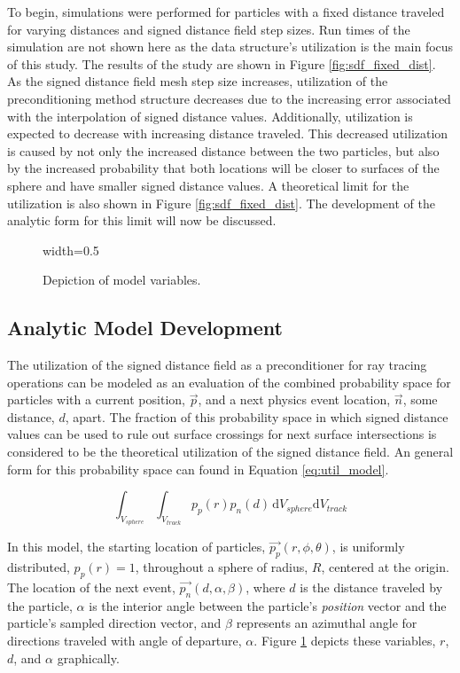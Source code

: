 To begin, simulations were performed for particles with a fixed distance
traveled for varying distances and signed distance field step sizes. Run times
of the simulation are not shown here as the data structure's utilization is the
main focus of this study. The results of the study are shown in
 Figure \ref{fig:sdf_fixed_dist}. As the signed distance field mesh step size
increases, utilization of the preconditioning method structure decreases due to the increasing
error associated with the interpolation of signed distance values. Additionally,
utilization is expected to decrease with increasing distance traveled. This
decreased utilization is caused by not only the increased distance between the
two particles, but also by the increased probability that both locations will be
closer to surfaces of the sphere and have smaller signed distance values. A
theoretical limit for the utilization is also shown in
 Figure \ref{fig:sdf_fixed_dist}. The development of the analytic form for this
limit will now be discussed.

\begin{figure}[ht]
  \centering
  {width=0.5\textwidth}
  \caption{Depiction of model variables.}
  \label{fig:model}
\end{figure}

\subsection{Analytic Model Development}
  
The utilization of the signed distance field as a preconditioner for ray tracing
operations can be modeled as an evaluation of the combined probability space for
particles with a current position, $\vec{p}$, and a next physics event location,
$\vec{n}$, some distance, $d$, apart. The fraction of this probability
space in which signed distance values can be used to rule out surface crossings
for next surface intersections is considered to be the theoretical
utilization of the signed distance field. An general form for this probability
space can found in Equation \ref{eq:util_model}.

\begin{equation}
  \label{eq:util_model}
\int_{V_{sphere}}\int_{V_{track}} p_p(r) p_n(d) \, \mathrm{d}V_{sphere}\mathrm{d}V_{track}
\end{equation}

In this model, the starting location of particles, $\vec{p_p}(r,\phi,\theta)$, is
uniformly distributed, $p_p(r)=1$, throughout a sphere of radius, $R$, centered
at the origin.  The location of the next event, $\vec{p_{n}}(d,\alpha,\beta)$, where $d$
is the distance traveled by the particle, $\alpha$ is the interior angle between
the particle's \textit{position} vector and the particle's sampled direction
vector, and $\beta$ represents an azimuthal angle for directions traveled with
angle of departure, $\alpha$. Figure \ref{fig:model} depicts these variables, $r$,
$d$, and $\alpha$ graphically.

